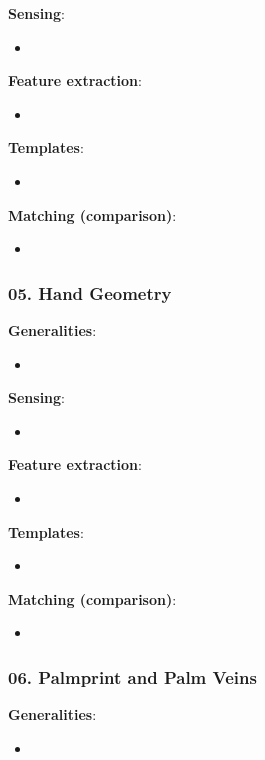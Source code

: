 \documentclass[a4paper]{article}
\begin{document}
      \textbf{Sensing}:
      \begin{itemize}
        \item 
      \end{itemize}

      \textbf{Feature extraction}:
      \begin{itemize}
        \item 
      \end{itemize}

      \textbf{Templates}:
      \begin{itemize}
        \item 
      \end{itemize}

      \textbf{Matching (comparison)}:
      \begin{itemize}
        \item 
      \end{itemize}
    \subsubsection*{05. Hand Geometry}
      \textbf{Generalities}:
      \begin{itemize}
        \item 
      \end{itemize}

      \textbf{Sensing}:
      \begin{itemize}
        \item 
      \end{itemize}

      \textbf{Feature extraction}:
      \begin{itemize}
        \item 
      \end{itemize}

      \textbf{Templates}:
      \begin{itemize}
        \item 
      \end{itemize}

      \textbf{Matching (comparison)}:
      \begin{itemize}
        \item 
      \end{itemize}
    \subsubsection*{06. Palmprint and Palm Veins}
      \textbf{Generalities}:
      \begin{itemize}
        \item 
      \end{itemize}
\end{document}
